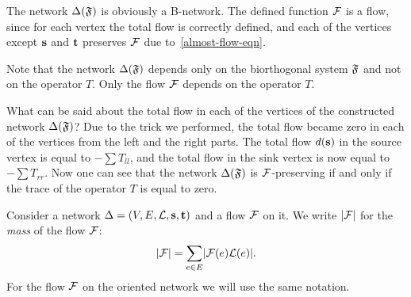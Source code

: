 \documentclass[12pt,oneside,a4paper]{amsart}
\begin{document}
      The network $\Delta(\mathfrak{F})$ is obviously a B-network.
      The defined function $\mathcal{F}$ is a flow, since for each vertex the total flow is correctly defined,
        and each of the vertices except $\mathbf{s}$ and $\mathbf{t}$ preserves $\mathcal{F}$ due to~\eqref{almost-flow-eqn}.
      \begin{remark}
        Note that the network $\Delta(\mathfrak{F})$ depends only on the biorthogonal system $\mathfrak{F}$ and not on the operator $T$.
        Only the flow $\mathcal{F}$ depends on the operator $T$.
      \end{remark}
      What can be said about the total flow in each of the vertices of the constructed network $\Delta(\mathfrak{F})$?
      Due to the trick we performed, the total flow became zero in each of the vertices from the left and the right parts.
      The total flow $d(\mathbf{s})$ in the source vertex is equal to $-\sum T_{ll}$, and the total flow in the
        sink vertex is now equal to $-\sum T_{rr}$.
      Now one can see that the network $\Delta(\mathfrak{F})$ is $\mathcal{F}$-preserving if and only if the trace of the operator $T$ is equal to zero.
      \begin{definition}
        Consider a network $\Delta = (V, E, \mathcal{L}, \mathbf{s}, \mathbf{t})$ and a flow $\mathcal{F}$ on it.
        We write $\lvert\mathcal{F}\rvert$ for the \emph{mass} of the flow $\mathcal{F}$:
        \[
          \lvert\mathcal{F}\rvert = \sum_{e \in E} \lvert\mathcal{F}(e) \mathcal{L}(e)\rvert.
        \]
        For the flow $\mathcal{F}$ on the oriented network we will use the same notation.
      \end{definition}
\end{document}
